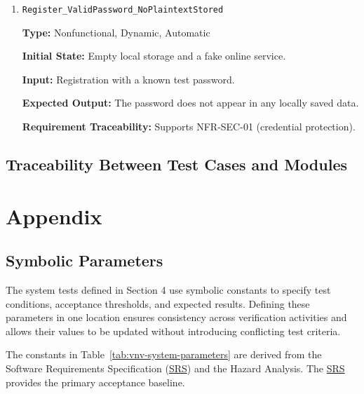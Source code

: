 \documentclass[12pt, titlepage]{article}
\begin{document}
\begin{enumerate}

\item \texttt{Register\_ValidPassword\_NoPlaintextStored}

\textbf{Type:} Nonfunctional, Dynamic, Automatic

\textbf{Initial State:} Empty local storage and a fake online service.

\textbf{Input:} Registration with a known test password.

\textbf{Expected Output:} The password does not appear in any locally saved data.

{\sloppy\textbf{Requirement Traceability:} Supports NFR-SEC-01 (credential protection).\par}

\end{enumerate}

\subsection{Traceability Between Test Cases and Modules}

				




\newpage

\section{Appendix}

\subsection{Symbolic Parameters}

\label{sec:symbolic-parameters}

The system tests defined in Section 4 use symbolic constants to specify test conditions, acceptance thresholds, and expected results. Defining these parameters in one location ensures consistency across verification activities and allows their values to be updated without introducing conflicting test criteria.

The constants in Table~\ref{tab:vnv-system-parameters} are derived from the Software Requirements Specification (\hyperlink{abbr:SRS}{SRS}) and the Hazard Analysis. The \hyperlink{abbr:SRS}{SRS} provides the primary acceptance baseline.
\end{document}
